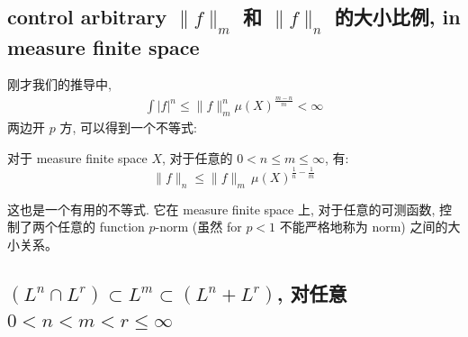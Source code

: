 \documentclass[lang=cn,11pt]{elegantbook}
\begin{document}
\subsection{control arbitrary $\|f \|_m $ 和 $\|f \|_n$ 的大小比例, in measure finite space}
\begin{remark}
刚才我们的推导中, \begin{align*}
      \int |f|^n \leq  \|f\|_m^n \mu(X)^{\frac{m-n}{m}} < \infty 
 \end{align*}
 两边开 $p$ 方, 可以得到一个不等式:  
 \begin{theorem}
     对于 measure finite space $X$, 对于任意的 $0< n\leq m \leq \infty$, 有: \[
     \|f\|_n \leq  \|  f \|_m \,\mu(X)^{\frac{1}{n} - \frac{1}{m}}
     \]\end{theorem}
 这也是一个有用的不等式. 它在 measure finite space 上, 对于任意的可测函数, 控制了两个任意的 function $p$-norm (虽然 for $p<1$ 不能严格地称为 norm) 之间的大小关系。
\end{remark}


\subsection{$(L^n\cap L^r) \subset L^m \subset (L^n + L^r)$, 对任意 $0< n < m < r \leq \infty$} 
\end{document}
